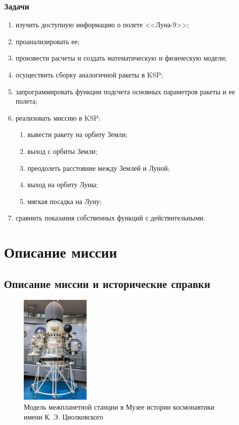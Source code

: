 \subsubsection*{Задачи}
\begin{enumerate}
	\item изучить доступную информацию о полете <<Луна-9>>;
	\item проанализировать ее;
	\item произвести расчеты и создать математическую и физическую модели;
	\item осуществить сборку аналогичной ракеты в KSP;
	\item запрограммировать функции подсчета основных параметров ракеты и ее полета;
	\item реализовать миссию в KSP:
	\begin{enumerate}
		\item вывести ракету на орбиту Земли;
		\item выход с орбиты Земли;
		\item преодолеть расстояние между Землей и Луной;
		\item выход на орбиту Луны;
		\item мягкая посадка на Луну;
	\end{enumerate}
	\item сравнить показания собственных функций с действительными.
\end{enumerate}


\section{Описание миссии}
\subsection{Описание миссии и исторические справки}
\begin{figure} %
	\centering
	\includegraphics[width=0.3\textwidth]{Luna_9_Space_Probe}
	\caption{Модель межпланетной станции в Музее истории космонавтики имени К. Э. Циолковского}
\end{figure}

